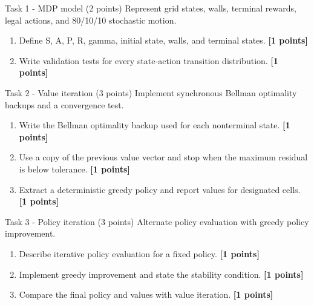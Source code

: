 \documentclass[aspectratio=169,11pt]{beamer}
\begin{document}
\begin{frame}{Task 1 - MDP model (2 points)}
\small
Represent grid states, walls, terminal rewards, legal actions, and 80/10/10 stochastic motion.

\vspace{0.2cm}
\begin{enumerate}
\item[\textbf{a.}] Define S, A, P, R, gamma, initial state, walls, and terminal states. \hfill{\color{courseblue}\textbf{[1 points]}}
\item[\textbf{b.}] Write validation tests for every state-action transition distribution. \hfill{\color{courseblue}\textbf{[1 points]}}
\end{enumerate}
\end{frame}

\begin{frame}{Task 2 - Value iteration (3 points)}
\small
Implement synchronous Bellman optimality backups and a convergence test.

\vspace{0.2cm}
\begin{enumerate}
\item[\textbf{a.}] Write the Bellman optimality backup used for each nonterminal state. \hfill{\color{courseblue}\textbf{[1 points]}}
\item[\textbf{b.}] Use a copy of the previous value vector and stop when the maximum residual is below tolerance. \hfill{\color{courseblue}\textbf{[1 points]}}
\item[\textbf{c.}] Extract a deterministic greedy policy and report values for designated cells. \hfill{\color{courseblue}\textbf{[1 points]}}
\end{enumerate}
\end{frame}

\begin{frame}{Task 3 - Policy iteration (3 points)}
\small
Alternate policy evaluation with greedy policy improvement.

\vspace{0.2cm}
\begin{enumerate}
\item[\textbf{a.}] Describe iterative policy evaluation for a fixed policy. \hfill{\color{courseblue}\textbf{[1 points]}}
\item[\textbf{b.}] Implement greedy improvement and state the stability condition. \hfill{\color{courseblue}\textbf{[1 points]}}
\item[\textbf{c.}] Compare the final policy and values with value iteration. \hfill{\color{courseblue}\textbf{[1 points]}}
\end{enumerate}
\end{frame}
\end{document}
